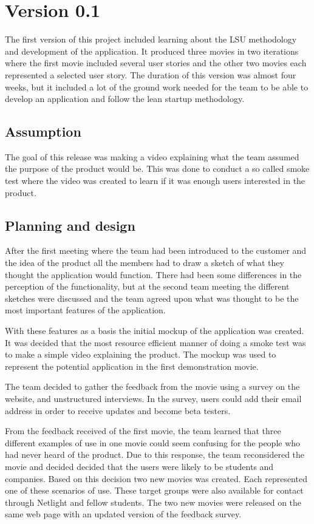 \section{Version 0.1}
The first version of this project included learning about the \gls{LSU} methodology and development of the application. It produced three movies in two iterations where the first movie included several user stories and the other two movies each represented a selected user story. The duration of this version was almost four weeks, but it included a lot of the ground work needed for the team to be able to develop an application and follow the lean startup methodology.

\subsection{Assumption}
The goal of this release was making a video explaining what the team assumed the purpose of the product would be. This was done to conduct a so called smoke test where the video was created to learn if it was enough users interested in the product.

\subsection{Planning and design}
After the first meeting where the team had been introduced to the customer and the idea of the product all the members  had to draw a sketch of what they thought the application would function. There had been some differences in the perception of the functionality, but at the second team meeting the different sketches were discussed and the team agreed upon what was thought to be the most important features of the application. 

With these features as a basis the initial \gls{mockup} of the application was created. It was decided that the most resource efficient manner of doing a smoke test was to make a simple video explaining the product. The \gls{mockup} was used to represent the potential application in the first demonstration movie. 

The team decided to gather the feedback from the movie using a survey on the website, and unstructured interviews. In the survey, users could add their email address in order to receive updates and become beta testers. 


From the feedback received of the first movie, the team learned that three different examples of use in one movie could seem confusing for the people who had never heard of the product. Due to this response, the team reconsidered the movie and decided decided that the users were likely to be students and companies. Based on this decision two new movies was created. Each represented one of these scenarios of use. These target groups were also available for contact through Netlight and fellow students. The two new movies were released on the same web page with an updated version of the feedback survey. 

